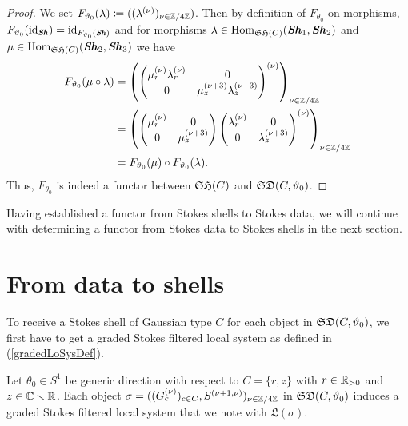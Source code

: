 \begin{proof}
We set $F_{\vartheta_0}(\lambda) \coloneqq ((\lambda^{(\nu)})_{\nu \in \mathbb{Z}/4\mathbb{Z}})$. Then by definition of $F_{\theta_0}$ on morphisms, $F_{\vartheta_0}(\operatorname{id}_{\bm{\mathit{Sh}}})=\operatorname{id}_{F_{\vartheta_0}(\bm{\mathit{Sh}})}$ and for morphisms $\lambda \in \operatorname{Hom}_{\mathfrak{SH}(C)}(\bm{\mathit{Sh}}_1, \bm{\mathit{Sh}}_2)$ and $\mu \in \operatorname{Hom}_{\mathfrak{SH}(C)}(\bm{\mathit{Sh}}_2, \bm{\mathit{Sh}}_3)$ we have
\begin{align*}
F_{\vartheta_0}(\mu \circ \lambda) & = \left(\begin{pmatrix}
            \mu_{r}^{(\nu)} \lambda_r^{(\nu)} & 0\\
            0 & \mu_z^{(\nu+3)} \lambda_z^{(\nu+3)}
        \end{pmatrix}^{(\nu)}\right)_{\nu \in \mathbb{Z}/4\mathbb{Z}} \\ & = 
        \left(\begin{pmatrix}
            \mu_r^{(\nu)} & 0\\
            0 & \mu_z^{(\nu+3)}
        \end{pmatrix}
        \begin{pmatrix}
            \lambda_r^{(\nu)} & 0 \\ 
            0 &  \lambda_{z}^{(\nu+3)}
        \end{pmatrix}
        ^{(\nu)}\right)_{\nu \in \mathbb{Z}/4\mathbb{Z}} \\ & = F_{\vartheta_0}(\mu) \circ F_{\vartheta_0}(\lambda).
\end{align*}
Thus, $F_{\theta_0}$ is indeed a functor between $\mathfrak{SH}(C)$ and $\mathfrak{SD}(C,\vartheta_0)$.
\end{proof}

Having established a functor from Stokes shells to Stokes data, we will continue with determining a functor from Stokes data to Stokes shells in the next section.

\section{From data to shells}
 To receive a Stokes shell of Gaussian type $C$ for each object in $\mathfrak{SD}(C,\vartheta_0)$, we first have to get a graded Stokes filtered local system as defined in (\ref{gradedLoSysDef}).

\begin{lem}\label{data-to-graded}
    Let $\theta_0 \in S^1$ be generic direction with respect to $C=\{r,z\}$ with $r \in \mathbb{R}_{>0}$ and $z \in \mathbb{C} \smallsetminus \mathbb{R}$. Each object $\sigma =((G_c^{(\nu)})_{c \in C}, S^{(\nu+1,\nu)})_{\nu \in \mathbb{Z}/4\mathbb{Z}}$ in $\mathfrak{SD}(C,\vartheta_0)$ induces a graded Stokes filtered local system that we note with $\mathfrak{L}(\sigma)$.
\end{lem}

